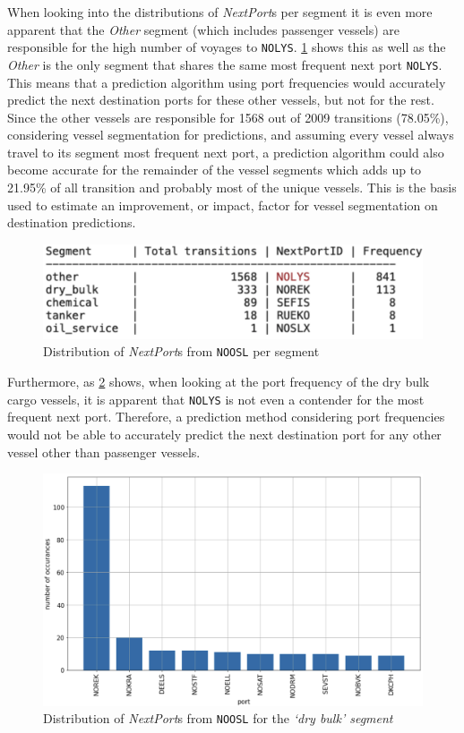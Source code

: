 When looking into the distributions of \textit{NextPort}s per segment it is even more apparent that the \textit{Other} segment (which includes passenger vessels) are responsible for the high number of voyages to \texttt{NOLYS}. \cref{fig:apw_noosl_segments} shows this as well as the \textit{Other} is the only segment that shares the same most frequent next port \texttt{NOLYS}. This means that a prediction algorithm using port frequencies would accurately predict the next destination ports for these other vessels, but not for the rest. Since the other vessels are responsible for 1568 out of 2009 transitions (78.05\%), considering vessel segmentation for predictions, and assuming every vessel always travel to its segment most frequent next port, a prediction algorithm could also become accurate for the remainder of the vessel segments which adds up to 21.95\% of all transition and probably most of the unique vessels. This is the basis used to estimate an improvement, or impact, factor for vessel segmentation on destination predictions.

\begin{figure}[htbp]
    \centering
    \includegraphics[width=.7\textwidth]{figures/apw/noosl_segments.png}
    \caption{Distribution of \textit{NextPort}s from \texttt{NOOSL} per segment}
    \label{fig:apw_noosl_segments}
\end{figure}

Furthermore, as \cref{fig:apw_noosl_dry_bulk} shows, when looking at the port frequency of the dry bulk cargo vessels, it is apparent that \texttt{NOLYS} is not even a contender for the most frequent next port. Therefore, a prediction method considering port frequencies would not be able to accurately predict the next destination port for any other vessel other than passenger vessels.

\begin{figure}[htbp]
    \centering
    \includegraphics[width=.9\textwidth]{figures/apw/noosl_dry_bulk.png}
    \caption{Distribution of \textit{NextPort}s from \texttt{NOOSL} for the \textit{`dry bulk' segment}\label{fig:apw_noosl_dry_bulk}}
\end{figure}

